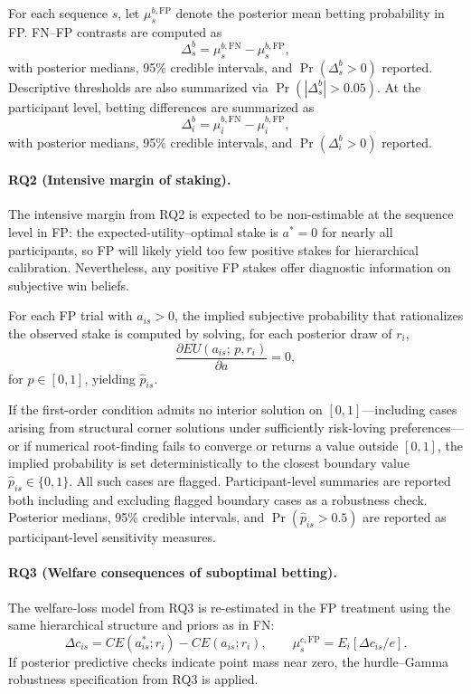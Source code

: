 \documentclass[11pt,a4paper]{article}
\numberwithin{equation}{section}
\begin{document}
For each sequence $s$, let $\mu_s^{b,\mathrm{FP}}$ denote the posterior mean betting 
probability in FP.  FN--FP contrasts are computed as
\[
\Delta_s^{b} = \mu_s^{b,\mathrm{FN}} - \mu_s^{b,\mathrm{FP}},
\]
with posterior medians, 95\% credible intervals, and $\Pr(\Delta_s^{b}>0)$ reported.  
Descriptive thresholds are also summarized via $\Pr(|\Delta_s^{b}| > 0.05)$.
At the participant level, betting differences are summarized as
\[
\Delta_i^{b} = \mu_i^{b,\mathrm{FN}} - \mu_i^{b,\mathrm{FP}},
\]
with posterior medians, 95\% credible intervals, and $\Pr(\Delta_i^{b}>0)$ reported.

\paragraph{RQ2 (Intensive margin of staking).}
The intensive margin from RQ2 is expected to be non-estimable at the sequence level 
in FP: the expected-utility--optimal stake is $a^{*}=0$ for nearly all participants, 
so FP will likely yield too few positive stakes for hierarchical calibration.  
Nevertheless, any positive FP stakes offer diagnostic information on subjective win 
beliefs.

For each FP trial with $a_{is} > 0$, the implied subjective probability that 
rationalizes the observed stake is computed by solving, for each posterior draw of 
$r_i$,
\[
\frac{\partial EU(a_{is};\,p, r_i)}{\partial a} = 0,
\]
for $p \in [0,1]$, yielding $\hat{p}_{is}$.  

If the first-order condition admits no interior solution on $[0,1]$—including cases 
arising from structural corner solutions under sufficiently risk-loving preferences—
or if numerical root-finding fails to converge or returns a value outside $[0,1]$, 
the implied probability is set deterministically to the closest boundary value 
$\hat{p}_{is} \in \{0,1\}$. All such cases are flagged. Participant-level summaries 
are reported both including and excluding flagged boundary cases as a robustness 
check. Posterior medians, 95\% credible intervals, and $\Pr(\hat{p}_{is} > 0.5)$ are reported 
as participant-level sensitivity measures.

\paragraph{RQ3 (Welfare consequences of suboptimal betting).}
The welfare-loss model from RQ3 is re-estimated in the FP treatment using the same 
hierarchical structure and priors as in FN:
\[
\Delta c_{is} = CE(a^{*}_{is}; r_i) - CE(a_{is}; r_i),
\qquad 
\mu_s^{c,\mathrm{FP}} = E_i[\Delta c_{is}/e].
\]
If posterior predictive checks indicate point mass near zero, the hurdle--Gamma 
robustness specification from RQ3 is applied.
\end{document}
